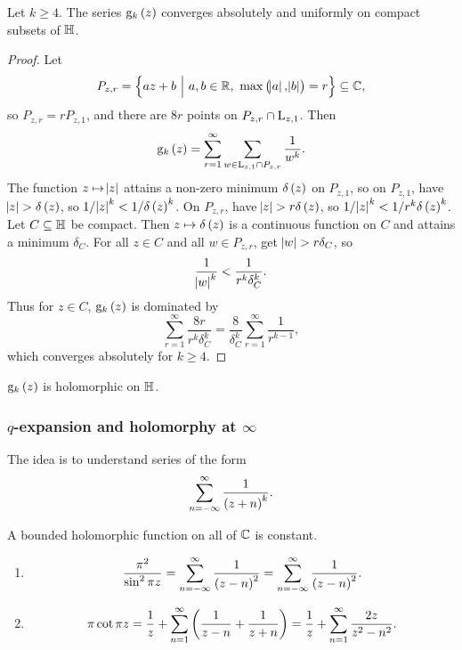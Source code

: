 \begin{theorem}
Let $ k \ge 4 $. The series $ \g_k\br{z} $ converges absolutely and uniformly on compact subsets of $ \mathbb{H} $.
\end{theorem}

\begin{proof}
Let
$$ P_{z, r} = \cbr{az + b \st a, b \in \RR, \ \max\br{\abs{a}, \abs{b}} = r} \subseteq \CC, $$
so $ P_{z, r} = rP_{z, 1} $, and there are $ 8r $ points on $ P_{z, r} \cap \mathrm{L}_{z, 1} $. Then
$$ \g_k\br{z} = \sum_{r = 1}^\infty \sum_{w \in \L_{z, 1} \cap P_{z, r}} \dfrac{1}{w^k}. $$
The function $ z \mapsto \abs{z} $ attains a non-zero minimum $ \delta\br{z} $ on $ P_{z, 1} $, so on $ P_{z, 1} $, have $ \abs{z} > \delta\br{z} $, so $ 1 / \abs{z}^k < 1 / \delta\br{z}^k $. On $ P_{z, r} $, have $ \abs{z} > r\delta\br{z} $, so $ 1 / \abs{z}^k < 1 / r^k\delta\br{z}^k $. Let $ C \subseteq \mathbb{H} $ be compact. Then $ z \mapsto \delta\br{z} $ is a continuous function on $ C $ and attains a minimum $ \delta_C $. For all $ z \in C $ and all $ w \in P_{z, r} $, get $ \abs{w} > r\delta_C $, so
$$ \dfrac{1}{\abs{w}^k} < \dfrac{1}{r^k\delta_C^k}. $$
Thus for $ z \in C $, $ \g_k\br{z} $ is dominated by
$$ \sum_{r = 1}^\infty \dfrac{8r}{r^k\delta_C^k} = \dfrac{8}{\delta_C^k}\sum_{r = 1}^\infty \dfrac{1}{r^{k - 1}}, $$
which converges absolutely for $ k \ge 4 $.
\end{proof}

\begin{corollary}
$ \g_k\br{z} $ is holomorphic on $ \mathbb{H} $.
\end{corollary}

\subsubsection{\texorpdfstring{$ q $}{q}-expansion and holomorphy at \texorpdfstring{$ \infty $}{infinity}}

The idea is to understand series of the form
$$ \sum_{n = -\infty}^\infty \dfrac{1}{\br{z + n}^k}. $$

\begin{theorem}
A bounded holomorphic function on all of $ \mathbb{C} $ is constant.
\end{theorem}

\begin{lemma}
\hfill
\begin{enumerate}
\item
$$ \dfrac{\pi^2}{\sin^2 \pi z} =  \sum_{n = -\infty}^\infty \dfrac{1}{\br{z - n}^2} = \sum_{n = -\infty}^\infty \dfrac{1}{\br{z - n}^2}. $$
\item
$$ \pi\cot \pi z = \dfrac{1}{z} + \sum_{n = 1}^\infty \br{\dfrac{1}{z - n} + \dfrac{1}{z + n}} = \dfrac{1}{z} + \sum_{n = 1}^\infty \dfrac{2z}{z^2 - n^2}. $$
\end{enumerate}
\end{lemma}

